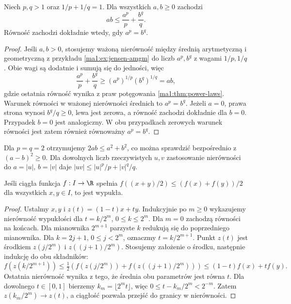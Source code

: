 \begin{twierdzenie}
\label{ma1:thm:young}
Niech $p,q>1$ oraz $1/p+1/q=1$. Dla wszystkich $a,b\ge0$ zachodzi
\[
 ab\le\frac{a^p}{p}+\frac{b^q}{q}.
\]
Równość zachodzi dokładnie wtedy, gdy $a^p=b^q$.
\end{twierdzenie}
\begin{proof}
Jeśli $a,b>0$, stosujemy ważoną nierówność między średnią arytmetyczną i geometryczną z przykładu \ref{ma1:ex:jensen-amgm} do liczb $a^p,b^q$ z wagami $1/p,1/q$. Obie wagi są dodatnie i sumują się do jedności, więc
\[
 \frac{a^p}{p}+\frac{b^q}{q}
 \ge (a^p)^{1/p}(b^q)^{1/q}=ab,
\]
gdzie ostatnia równość wynika z praw potęgowania \ref{ma1:thm:power-laws}. Warunek równości w ważonej nierówności średnich to $a^p=b^q$. Jeżeli $a=0$, prawa strona wynosi $b^q/q\ge0$, lewa jest zerowa, a równość zachodzi dokładnie dla $b=0$. Przypadek $b=0$ jest analogiczny. W obu przypadkach zerowych warunek równości jest zatem również równoważny $a^p=b^q$.
\end{proof}
Dla $p=q=2$ otrzymujemy $2ab\le a^2+b^2$, co można sprawdzić bezpośrednio z $(a-b)^2\ge0$. Dla dowolnych liczb rzeczywistych $u,v$ zastosowanie nierówności do $a=|u|$, $b=|v|$ daje $|uv|\le |u|^p/p+|v|^q/q$.

\begin{stwierdzenie}
\label{ma1:prop:midpoint-convex}
Jeśli ciągła funkcja $f:I\to\R$ spełnia $f((x+y)/2)\le(f(x)+f(y))/2$ dla wszystkich $x,y\in I$, to jest wypukła.
\end{stwierdzenie}
\begin{proof}
Ustalmy $x,y$ i $z(t)=(1-t)x+ty$. Indukcyjnie po $m\ge0$ wykazujemy nierówność wypukłości dla $t=k/2^m$, $0\le k\le 2^m$. Dla $m=0$ zachodzą równości na końcach. Dla mianownika $2^{m+1}$ parzyste $k$ redukują się do poprzedniego mianownika. Dla $k=2j+1$, $0\le j<2^m$, oznaczmy $t=k/2^{m+1}$. Punkt $z(t)$ jest środkiem $z(j/2^m)$ i $z((j+1)/2^m)$. Stosujemy założenie o środku, następnie indukcję do obu składników:
\[
 f(z(k/2^{m+1}))\le
 \tfrac12(f(z(j/2^m))+f(z((j+1)/2^m)))
 \le (1-t)f(x)+tf(y).
\]
Ostatnia nierówność wynika z tego, że średnia obu parametrów jest równa $t$. Dla dowolnego $t\in[0,1]$ bierzemy $k_m=\lfloor2^mt\rfloor$, więc $0\le t-k_m/2^m<2^{-m}$. Zatem $z(k_m/2^m)\to z(t)$, a ciągłość pozwala przejść do granicy w nierówności.
\end{proof}

